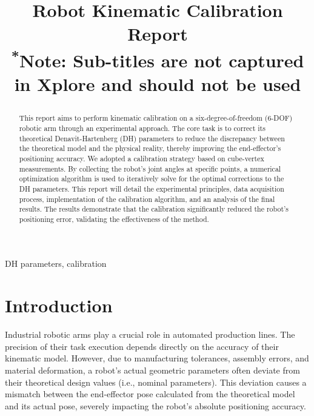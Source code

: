 \documentclass[conference]{IEEEtran}
\begin{document}
\title{Robot Kinematic Calibration Report\\

{\footnotesize \textsuperscript{*}Note: Sub-titles are not captured in Xplore and
should not be used}

}

\author{

}

\maketitle

\begin{abstract}
This report aims to perform kinematic calibration on a six-degree-of-freedom (6-DOF) robotic arm through an experimental approach. The core task is to correct its theoretical Denavit-Hartenberg (DH) parameters to reduce the discrepancy between the theoretical model and the physical reality, thereby improving the end-effector's positioning accuracy. We adopted a calibration strategy based on cube-vertex measurements. By collecting the robot's joint angles at specific points, a numerical optimization algorithm is used to iteratively solve for the optimal corrections to the DH parameters. This report will detail the experimental principles, data acquisition process, implementation of the calibration algorithm, and an analysis of the final results. The results demonstrate that the calibration significantly reduced the robot's positioning error, validating the effectiveness of the method.
\end{abstract}

\begin{IEEEkeywords}
 DH parameters, calibration
\end{IEEEkeywords}

\section{Introduction}
Industrial robotic arms play a crucial role in automated production lines. The precision of their task execution depends directly on the accuracy of their kinematic model. However, due to manufacturing tolerances, assembly errors, and material deformation, a robot's actual geometric parameters often deviate from their theoretical design values (i.e., nominal parameters). This deviation causes a mismatch between the end-effector pose calculated from the theoretical model and its actual pose, severely impacting the robot's absolute positioning accuracy.
\end{document}
